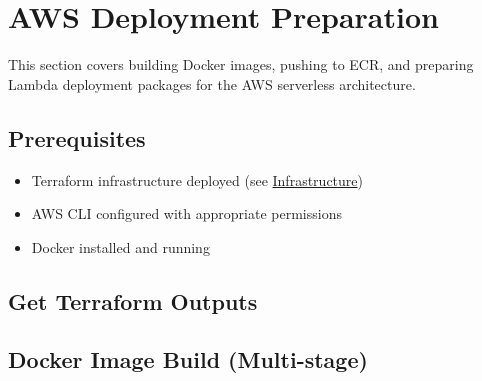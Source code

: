 \hypertarget{aws-deployment-preparation}{%
\section{AWS Deployment Preparation}}

This section covers building Docker images, pushing to ECR, and
preparing Lambda deployment packages for the AWS serverless
architecture.

\hypertarget{prerequisites}{%
\subsection{Prerequisites}}

\begin{itemize}
\tightlist
\item
  Terraform infrastructure deployed (see
  \href{5.3-Infrastructure/}{Infrastructure})
\item
  AWS CLI configured with appropriate permissions
\item
  Docker installed and running
\end{itemize}

\hypertarget{get-terraform-outputs}{%
\subsection{Get Terraform Outputs}}

\begin{Shaded}
\begin{Highlighting}[]
\OperatorTok{=}\VariableTok{$(}\VariableTok{)}
\OperatorTok{=}\VariableTok{$(}\VariableTok{)}
\OperatorTok{=}\VariableTok{$(}\VariableTok{)}

 
 
 
\end{Highlighting}
\end{Shaded}

\hypertarget{docker-image-build-multi-stage}{%
\subsection{Docker Image Build
(Multi-stage)}}

